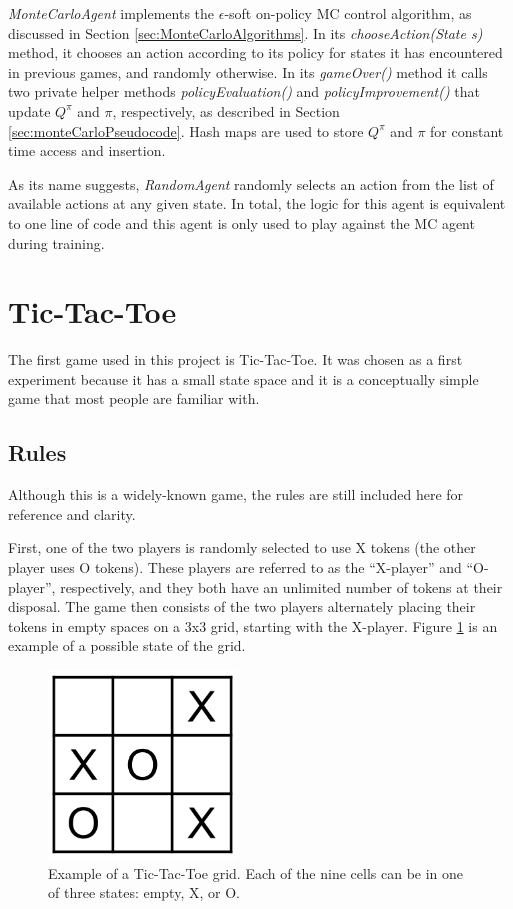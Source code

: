 \documentclass[11pt,a4paper]{report}
\begin{document}
\emph{MonteCarloAgent} implements the $\epsilon$-soft on-policy MC control algorithm, as discussed in Section \ref{sec:MonteCarloAlgorithms}. In its \emph{chooseAction(State s)} method, it chooses an action according to its policy for states it has encountered in previous games, and randomly otherwise. In its \emph{gameOver()} method it calls two private helper methods \emph{policyEvaluation()} and \emph{policyImprovement()} that update $Q^{\pi}$ and $\pi$, respectively, as described in Section \ref{sec:monteCarloPseudocode}. Hash maps are used to store $Q^{\pi}$ and $\pi$ for constant time access and insertion.

As its name suggests, \emph{RandomAgent} randomly selects an action from the list of available actions at any given state. In total, the logic for this agent is equivalent to one line of code and this agent is only used to play against the MC agent during training.


\section{Tic-Tac-Toe}
\label{sec:TicTacToe}

The first game used in this project is Tic-Tac-Toe. It was chosen as a first experiment because it has a small state space and it is a conceptually simple game that most people are familiar with.


\subsection{Rules}

Although this is a widely-known game, the rules \cite{tic-tac-toe-rules} are still included here for reference and clarity.

First, one of the two players is randomly selected to use X tokens (the other player uses O tokens). These players are referred to as the ``X-player'' and ``O-player'', respectively, and they both have an unlimited number of tokens at their disposal. The game then consists of the two players alternately placing their tokens in empty spaces on a 3x3 grid, starting with the X-player. Figure \ref{tic-tac-toe-grid-example} is an example of a possible state of the grid.

\begin{figure}[htbp]
	\begin{center}
		\includegraphics[width=50mm]{tictactoe_grid_example.png}
		\caption{Example of a Tic-Tac-Toe grid. Each of the nine cells can be in one of three states: empty, X, or O.}
		\label{tic-tac-toe-grid-example}
	\end{center}
\end{figure}
\end{document}
